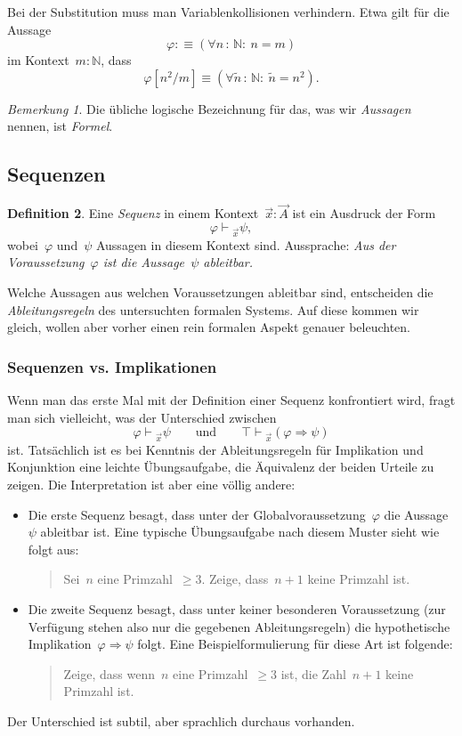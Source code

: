 \documentclass[a4paper,ngerman,12pt]{scrartcl}
\theoremstyle{definition}
\newtheorem{defn}{Definition}[section]
\theoremstyle{plain}
\theoremstyle{remark}
\newtheorem{bem}[defn]{Bemerkung}
\newcommand{\NN}{\mathbb{N}}
\newcommand{\seq}[1]{\mathrel{\vdash\!\!\!_{#1}}}
\renewcommand{\_}{\mathpunct{.}\,}
\newcommand{\?}{\,{:}\,}
\begin{document}
Bei der Substitution muss man Variablenkollisionen verhindern. Etwa gilt für
die Aussage
\[ \varphi :\equiv (\forall n\?\NN{:}\ n = m) \]
im Kontext~$m : \NN$, dass
\[ \varphi[n^2/m] \equiv (\forall \tilde n\?\NN{:}\ \tilde n = n^2). \]

\begin{bem}Die übliche logische Bezeichnung für das, was wir \emph{Aussagen}
nennen, ist \emph{Formel}.\end{bem}


\subsection{Sequenzen}

\begin{defn}Eine \emph{Sequenz} in einem Kontext~$\vec x : \vec A$ ist ein
Ausdruck der Form
\[ \varphi \seq{\vec x} \psi, \]
wobei~$\varphi$ und~$\psi$ Aussagen in diesem Kontext sind. Aussprache:
\emph{Aus der Voraussetzung~$\varphi$ ist die Aussage~$\psi$ ableitbar.}
\end{defn}

Welche Aussagen aus welchen Voraussetzungen ableitbar sind, entscheiden die
\emph{Ableitungsregeln} des untersuchten formalen Systems. Auf diese kommen wir
gleich, wollen aber vorher einen rein formalen Aspekt genauer beleuchten.


\subsubsection*{Sequenzen vs. Implikationen}

Wenn man das erste Mal mit der Definition einer Sequenz konfrontiert wird,
fragt man sich vielleicht, was der Unterschied zwischen
\[ \text{$\varphi \seq{\vec x} \psi$} \qquad\text{und}\qquad
  \text{$\top \seq{\vec x} (\varphi \Rightarrow \psi)$} \]
ist. Tatsächlich ist es bei Kenntnis der Ableitungsregeln für Implikation und
Konjunktion eine leichte Übungsaufgabe, die Äquivalenz der beiden Urteile zu
zeigen. Die Interpretation ist aber eine völlig andere:
\begin{itemize}
\item Die erste Sequenz besagt, dass unter der Globalvoraussetzung~$\varphi$
die Aussage~$\psi$ ableitbar ist. Eine typische Übungsaufgabe nach diesem
Muster sieht wie folgt aus:
\begin{quote}Sei~$n$ eine Primzahl~$\geq 3$. Zeige, dass~$n + 1$ keine Primzahl
ist.\end{quote}
\item Die zweite Sequenz besagt, dass unter keiner besonderen Voraussetzung
(zur Verfügung stehen also nur die gegebenen Ableitungsregeln) die
hypothetische Implikation~$\varphi \Rightarrow \psi$ folgt. Eine
Beispielformulierung für diese Art ist folgende:
\begin{quote}Zeige, dass wenn~$n$ eine Primzahl~$\geq 3$ ist, die Zahl~$n + 1$
keine Primzahl ist.\end{quote}
\end{itemize}
Der Unterschied ist subtil, aber sprachlich durchaus vorhanden.
\end{document}
